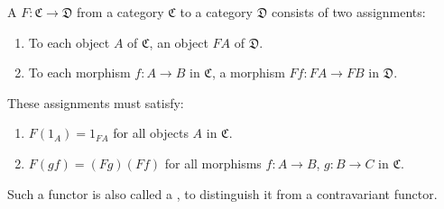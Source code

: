 A  $F: \mathfrak{C} \to \mathfrak{D}$ from a category $\mathfrak{C}$ to a category $\mathfrak{D}$ consists of two assignments:
\begin{enumerate}
\item[(i)] To each object $A$ of $\mathfrak{C}$, an object $FA$ of $\mathfrak{D}$.
\item[(ii)] To each morphism $f: A \to B$ in $\mathfrak{C}$, a morphism $Ff: FA \to FB$ in $\mathfrak{D}$.
\end{enumerate}
These assignments must satisfy:
\begin{enumerate}
\item[(a)] $F(1_A) = 1_{FA}$ for all objects $A$ in $\mathfrak{C}$.
\item[(b)] $F(gf) = (Fg)(Ff)$ for all morphisms $f: A \to B$, $g: B \to C$ in $\mathfrak{C}$.
\end{enumerate}
Such a functor is also called a , to distinguish it from a contravariant functor.
